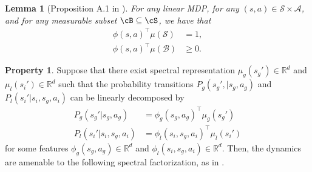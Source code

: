 \documentclass{article}
\newcommand\R{\mathbb{R}}
\theoremstyle{plain}
\newtheorem{lemma}[theorem]{Lemma}
\theoremstyle{definition}
\newtheorem{property}[theorem]{Property}
\begin{document}
\begin{lemma}[Proposition A.1 in \cite{pmlr-v125-jin20a}]
    \emph{For any linear MDP, for any $(s,a)\in\mathcal{S}\times\mathcal{A}$, and for any measurable subset $\cB\subseteq \cS$, we have that}
    \begin{align*}\phi(s,a)^\top \mu(\mathcal{S}) &= 1,\\ \phi(s,a)^\top \mu(\mathcal{B})&\geq 0.\end{align*}
\end{lemma}


\begin{property}Suppose that there exist spectral representation $\mu_g(s_g')\in \R^d$ and $\mu_l(s_i') \in \R^d$ such that the probability transitions $P_g(s_g',|s_g,a_g)$ and $P_l(s_i'|s_i,s_g,a_i)$ can be linearly decomposed by 
\begin{align*}P_g(s_g'|s_g,a_g) &= \phi_g(s_g,a_g)^\top \mu_g(s_g')\\
P_l(s_i'|s_i,s_g,a_i) &= \phi_l(s_i,s_g,a_i)^\top \mu_l(s_i')
\end{align*}
for some features $\phi_g(s_g,a_g)\in\R^d$ and $\phi_l(s_i,s_g,a_i)\in\R^d$. Then, the dynamics are amenable to the following spectral factorization, as in \cite{ren2024scalablespectralrepresentationsnetwork}.\\
\end{property}
\end{document}
